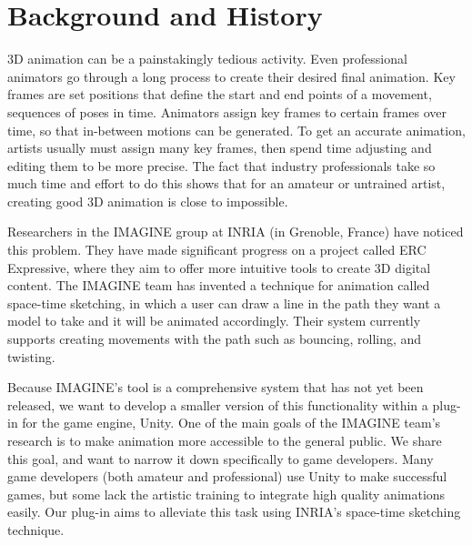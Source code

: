 \section{Background and History}
3D animation can be a painstakingly tedious activity. Even professional animators go through a long process to create their desired final animation. Key frames are set positions that define the start and end points of a movement, sequences of poses in time. Animators assign key frames to certain frames over time, so that in-between motions can be generated. To get an accurate animation, artists usually must assign many key frames, then spend time adjusting and editing them to be more precise. The fact that industry professionals take so much time and effort to do this shows that for an amateur or untrained artist, creating good 3D animation is close to impossible.

Researchers in the IMAGINE group at INRIA (in Grenoble, France) have noticed this problem. They have made significant progress on a project called ERC Expressive, where they aim to offer more intuitive tools to create 3D digital content. The IMAGINE team has invented a technique for animation called space-time sketching, in which a user can draw a line in the path they want a model to take and it will be animated accordingly. Their system currently supports creating movements with the path such as bouncing, rolling, and twisting. 

Because IMAGINE's tool is a comprehensive system that has not yet been released, we want to develop a smaller version of this functionality within a plug-in for the game engine, Unity. One of the main goals of the IMAGINE team's research is to make animation more accessible to the general public. We share this goal, and want to narrow it down specifically to game developers. Many game developers (both amateur and professional) use Unity to make successful games, but some lack the artistic training to integrate high quality animations easily. Our plug-in aims to alleviate this task using INRIA's space-time sketching technique.